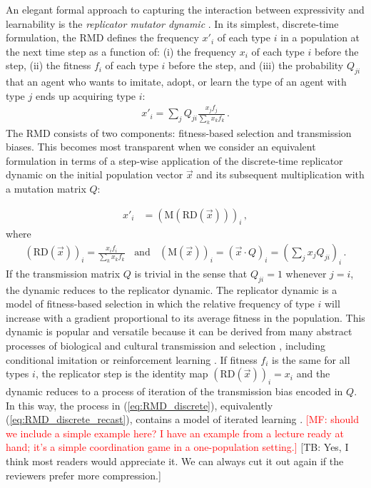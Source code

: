 \documentclass[a4paper]{article}
\newcommand{\mf}[1]{\textcolor{Red}{[MF: #1]}}
\newcommand{\tb}[1]{\textcolor[rgb]{.8,.33,.0}{[TB: #1]}}%
\begin{document}
An elegant formal approach to capturing the interaction between expressivity and learnability
is the \emph{replicator mutator dynamic}
\citep{Hofbauer1985:The-Selection-M,nowak+etal:2000,NowakKomarova2001:Evolution-of-Un,hofbauer+sigmund:2003,Nowak2006:Evolutionary-Dy}. In
its simplest, discrete-time formulation, the RMD defines the frequency $x'_i$ of each type $i$
in a population at the next time step as a function of: (i) the frequency $x_i$ of each type
$i$ before the step, (ii) the fitness $f_i$ of each type $i$ before the step, and (iii) the
probability $Q_{ji}$ that an agent who wants to imitate, adopt, or learn the type of an agent
with type $j$ ends up acquiring type $i$:
\begin{align}
  \label{eq:RMD_discrete}
  x'_i = \sum_j Q_{ji} \frac{x_jf_j}{\sum_k x_k f_k}\,.
\end{align}
The RMD consists of two components: fitness-based selection and transmission biases. This
becomes most transparent when we consider an equivalent formulation in terms of a step-wise
application of the discrete-time replicator dynamic \citep{TaylorJonker1978:Evolutionary-St} on the initial population vector $\vec{x}$
and its subsequent multiplication with a mutation matrix $Q$:

\begin{align}
  \label{eq:RMD_discrete_recast}
  x'_i & = (\text{M}(\text{RD}(\vec{x})))_i\,,
\end{align}
where
\begin{align*}
      \left ( \text{RD}(\vec{x}) \right )_i 
         = \frac{x_i f_i}{\sum_k x_k f_k}
 \ \ \ \ \text{and} \ \ \ \ 
  (\text{M}(\vec{x}))_i = (\vec{x} \cdot Q)_i = \left ( \sum_j
          x_j Q_{ji} \right)_i\,.
\end{align*}
If the transmission matrix $Q$ is trivial in the sense that $Q_{ji}=1$ whenever $j=i$, the
dynamic reduces to the replicator dynamic. The replicator dynamic is a model of fitness-based
selection in which the relative frequency of type $i$ will increase with a gradient
proportional to its average fitness in the population. This dynamic is popular and
versatile because it can be derived from many abstract processes of biological and cultural
transmission and selection \citep[for overview and several derivations
see][]{Sandholm2010:Population-Game}, including conditional imitation
\citep[e.g.,][]{Helbing1996:A-Stochastic-Be,Schlag1998:Why-Imitate-and} or reinforcement
learning \citep[e.g.,][]{BorgersSarin997:Learning-Throug,Beggs2005:On-the-Converge}. If fitness
$f_i$ is the same for all types $i$, the replicator step is the identity map
$ \left ( \text{RD}(\vec{x}) \right )_i = x_i$ and the dynamic reduces to a process of
iteration of the transmission bias encoded in $Q$. In this way, the process in
(\ref{eq:RMD_discrete}), equivalently (\ref{eq:RMD_discrete_recast}), contains a model of
iterated learning \citep{griffiths+kalish:2007}. \mf{should we include a simple example here? I 
have an example from a lecture ready at hand; it's a simple coordination game in a
one-population setting.} \tb{Yes, I think most readers would appreciate it. We can always cut it out again if the reviewers prefer more compression.} 
\end{document}
